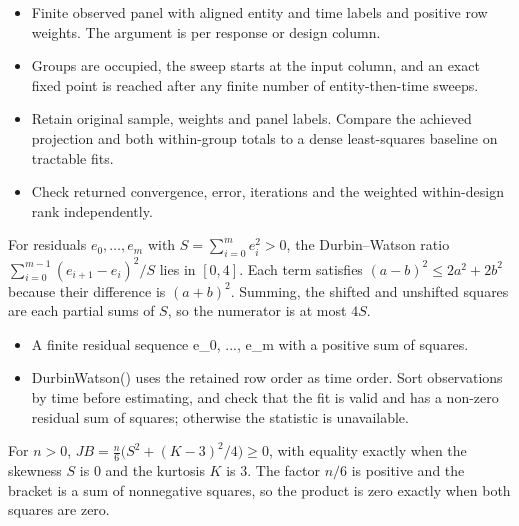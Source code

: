 \expandafter\def\csname statadic@assumptions@STATADIC-PANEL-006\endcsname{\begin{itemize}
\item Finite observed panel with aligned entity and time labels and positive row weights. The argument is per response or design column.
\item Groups are occupied, the sweep starts at the input column, and an exact fixed point is reached after any finite number of entity-then-time sweeps.
\end{itemize}}
\expandafter\def\csname statadic@diagnostics@STATADIC-PANEL-006\endcsname{\begin{itemize}
\item Retain original sample, weights and panel labels. Compare the achieved projection and both within-group totals to a dense least-squares baseline on tractable fits.
\item Check returned convergence, error, iterations and the weighted within-design rank independently.
\end{itemize}}
\expandafter\def\csname statadic@statement@STATADIC-DW-001\endcsname{For residuals $e_0,\ldots,e_m$ with
  $S=\sum_{i=0}^{m}e_i^2>0$, the Durbin--Watson ratio
  $\sum_{i=0}^{m-1}(e_{i+1}-e_i)^2/S$ lies in $[0,4]$.}
\expandafter\def\csname statadic@proof@STATADIC-DW-001\endcsname{Each term satisfies $(a-b)^2\le 2a^2+2b^2$ because their
  difference is $(a+b)^2$. Summing, the shifted and unshifted squares are each
  partial sums of $S$, so the numerator is at most $4S$.}
\expandafter\def\csname statadic@assumptions@STATADIC-DW-001\endcsname{\begin{itemize}
\item A finite residual sequence e\_0, ..., e\_m with a positive sum of squares.
\end{itemize}}
\expandafter\def\csname statadic@diagnostics@STATADIC-DW-001\endcsname{\begin{itemize}
\item DurbinWatson() uses the retained row order as time order. Sort observations by time before estimating, and check that the fit is valid and has a non-zero residual sum of squares; otherwise the statistic is unavailable.
\end{itemize}}
\expandafter\def\csname statadic@statement@STATADIC-JB-001\endcsname{For $n>0$, $JB=\tfrac n6\bigl(S^2+(K-3)^2/4\bigr)\ge0$,
  with equality exactly when the skewness $S$ is $0$ and the kurtosis $K$
  is $3$.}
\expandafter\def\csname statadic@proof@STATADIC-JB-001\endcsname{The factor $n/6$ is positive and the bracket is a sum of
  nonnegative squares, so the product is zero exactly when both squares
  are zero.}
